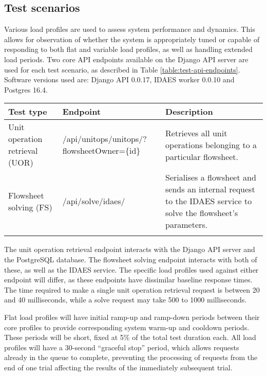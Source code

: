 
\subsection{Test scenarios}

Various load profiles are used to assess system performance and dynamics. This allows for observation of whether the system is appropriately tuned or capable of responding to both flat and variable load profiles, as well as handling extended load periods. Two core API endpoints available on the Django API server are used for each test scenario, as described in Table \ref{table:test-api-endpoints}. Software versions used are: Django API 0.0.17, IDAES worker 0.0.10 and Postgres 16.4.

\begin{tabularx}{\textwidth}{|p{}|X|p{}|}
    \hline
    \textbf{Test type} & \textbf{Endpoint} & \textbf{Description} \\ \hline
    Unit operation retrieval (UOR) & /api/unitops/unitops/?flowsheetOwner=\{id\} & Retrieves all unit operations belonging to a particular flowsheet. \\ \hline

    Flowsheet solving (FS) & /api/solve/idaes/ & Serialises a flowsheet and sends an internal request to the IDAES service to solve the flowsheet's parameters. \\ \hline

    \caption{API endpoints used for system testing}
    \label{table:test-api-endpoints}
\end{tabularx}

The unit operation retrieval endpoint interacts with the Django API server and the PostgreSQL database. The flowsheet solving endpoint interacts with both of these, as well as the IDAES service. The specific load profiles used against either endpoint will differ, as these endpoints have dissimilar baseline response times. The time required to make a single unit operation retrieval request is between 20 and 40 milliseconds, while a solve request may take 500 to 1000 milliseconds.


Flat load profiles will have initial ramp-up and ramp-down periods between their core profiles to provide corresponding system warm-up and cooldown periods. These periods will be short, fixed at 5\% of the total test duration each. All load profiles will have a 30-second ``graceful stop'' period, which allows requests already in the queue to complete, preventing the processing of requests from the end of one trial affecting the results of the immediately subsequent trial.

